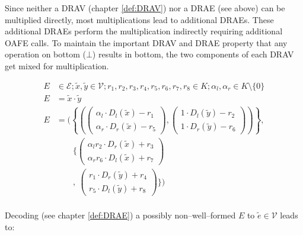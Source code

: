 \label{sec:DRAE-multiplication}

Since neither a DRAV (chapter \ref{def:DRAV}) nor a DRAE (see above) can be
multiplied directly, most multiplications lead to additional DRAEs. These
additional DRAEs perform the multiplication indirectly requiring additional OAFE
calls. To maintain the important DRAV and DRAE property that any operation on
bottom ($\bot$) results in bottom, the two components of each DRAV get mixed for
multiplication.




\begin{align*}
  E & \in \mathcal{E}; \widetilde{x}, \widetilde{y} \in \mathcal{V};
  r_1, r_2, r_3, r_4, r_5, r_6, r_7, r_8 \in K;
  \alpha_l, \alpha_r \in K \setminus \{0\} \\
  E & = \widetilde{x} \cdot \widetilde{y} \\
  E & = \Bigg(\left\{\left(
            \begin{pmatrix}
              \alpha_l \cdot D_l(\widetilde{x}) - r_1 \\
              \alpha_r \cdot D_r(\widetilde{x}) - r_5
            \end{pmatrix},
            \begin{pmatrix}
              1        \cdot D_l(\widetilde{y}) - r_2 \\
              1        \cdot D_r(\widetilde{y}) - r_6
            \end{pmatrix}
        \right)\right\}, \\
    &   \qquad\bigg\{
        \begin{pmatrix}
            \alpha_lr_2 \cdot D_r(\widetilde{x}) + r_3 \\
            \alpha_rr_6 \cdot D_l(\widetilde{x}) + r_7
          \end{pmatrix} \\
    &  \qquad,
        \ \begin{pmatrix}
            r_1        \cdot D_r(\widetilde{y}) + r_4 \\
            r_5        \cdot D_l(\widetilde{y}) + r_8
          \end{pmatrix}
        \bigg\}\Bigg) \\
\end{align*}

Decoding (see chapter \ref{def:DRAE}) a possibly non--well--formed $E$ to
$\widetilde{e} \in \mathcal{V}$ leads to:

